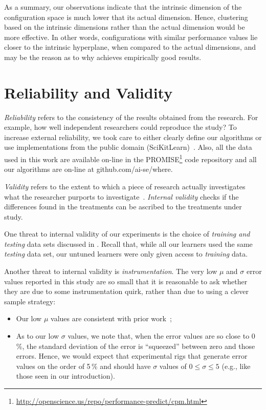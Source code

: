 As a summary, our observations indicate that the intrinsic dimension of the configuration space is much lower that its actual dimension. Hence, clustering based on the intrinsic dimensions rather than the actual dimension would be more effective. In other words, configurations with similar performance values lie closer to the intrinsic hyperplane, when compared to the actual dimensions, and may be the reason as to why \what achieves empirically good results.


\section{Reliability and Validity}\label{sect:construct}

{\em Reliability} refers to the consistency of the results obtained
from the research.  For example,   how well independent researchers
could reproduce the study? To increase external
reliability, we took care to either  clearly define our
algorithms or use implementations from the public domain
(SciKitLearn)~\cite{scikit-learn}. Also, all the data used in this work are available
on-line in the PROMISE\footnote{\url{http://openscience.us/repo/performance-predict/cpm.html}} code repository and all our algorithms
are on-line at github.com/ai-se/where.

{\em Validity} refers to the extent to which a piece of research actually
investigates what the researcher purports to investigate~\cite{SSA15}.
{\em Internal validity} checks if the differences found in
the treatments can be ascribed to the treatments under study. 

One threat to internal validity of our experiments is the choice
of {\em training and testing} data sets discussed in 
. Recall that, while all our learners used the same
{\em testing} data set, our untuned learners were only given
access to {\em training} data.

Another threat to internal validity  is {\em instrumentation}. The very low $\mu$ and $\sigma$ error values
reported in this study are so small that it is reasonable to ask whether they are due to some instrumentation
quirk, rather than due to using a clever sample strategy:
\begin{itemize}
\item
Our low $\mu$ values are consistent with prior work~\cite{sarkar2015cost};
\item
As to our low $\sigma$ values, we note that, when the  error values are so close to 0\,\%, the standard
deviation of the error is ``squeezed'' between zero and those errors. Hence, we would expect that
experimental rigs
that generate error values on the order of 5\,\% and  should have $\sigma$ values of $0\le \sigma \le 5$ (e.g., like those seen in our introduction).
\end{itemize}

